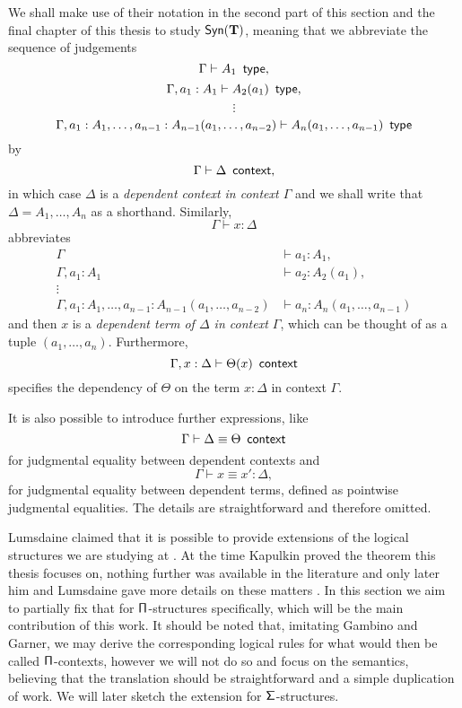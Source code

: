 \begin{notation}
  We shall make use of their notation \cite[4]{GG08} in the second part of this
  section and the final chapter of this thesis to study $\mathsf{Syn}(\mathbf{\operatorname{\mathbf{T}}})$, meaning that
  we abbreviate the sequence of judgements
  \[\Gamma\vdash A_1\operatorname{\ \mathsf{type}},\]
  \[\Gamma,a_1:A_1\vdash A_2(a_1)\operatorname{\ \mathsf{type}},\]
  \[\vdots\]
  \[\Gamma,a_1:A_1,\ldots,a_{n-1}:A_{n-1}(a_1,\ldots,a_{n-2})\vdash
  A_n(a_1,\ldots,a_{n-1})\operatorname{\ \mathsf{type}}\]
  by
  \[\Gamma\vdash\Delta\operatorname{\ \mathsf{context}},\]
  in which case $\Delta$ is a \emph{dependent context in context $\Gamma$} and
  we shall write that $\Delta=A_1,\ldots,A_n$ as a shorthand.
  Similarly,
  \[\Gamma\vdash x:\Delta\]
  abbreviates
  \begin{align*}
    \Gamma &\vdash a_1:A_1, \\
    \Gamma,a_1:A_1 &\vdash a_2:A_2(a_1), \\
    \vdots & \\
    \Gamma,a_1:A_1,\ldots,a_{n-1}:A_{n-1}(a_1,\ldots,a_{n-2})
           &\vdash a_n:A_n(a_1,\ldots,a_{n-1})
  \end{align*}
  and then $x$ is a \emph{dependent term of $\Delta$ in context $\Gamma$}, which
  can be thought of as a tuple $(a_1,\ldots,a_n)$. Furthermore,
  \[\Gamma,x:\Delta\vdash\Theta(x)\operatorname{\ \mathsf{context}}\]
  specifies the dependency of $\Theta$ on the term $x:\Delta$ in context
  $\Gamma$.

  \noindent
  It is also possible to introduce further expressions, like
  \[\Gamma\vdash \Delta\equiv\Theta\operatorname{\ \mathsf{context}}\]
  for judgmental equality between dependent contexts and
  \[\Gamma\vdash x\equiv x':\Delta,\]
  for judgmental equality between dependent terms, defined as pointwise
  judgmental equalities. The details are straightforward and therefore omitted.
\end{notation}
\noindent

Lumsdaine claimed that it is possible to provide extensions of the logical
structures we are studying at \cite[26]{Lum10}. At the
time Kapulkin proved the theorem this thesis focuses on,
nothing further was available in the literature and only later him and
Lumsdaine gave more details on these matters \cite{KL18}. In this section we aim
to partially fix that for $\operatorname{\mathsf{\Pi}}$-structures specifically, which will be the main
contribution of this work. It should be noted that, imitating Gambino and
Garner, we may derive the
corresponding logical rules for what would then be called $\operatorname{\mathsf{\Pi}}$-contexts,
however we will not do so and focus on the semantics, believing that the
translation should be straightforward and a simple duplication of work. We will
later sketch the extension for $\operatorname{\mathsf{\Sigma}}$-structures.


